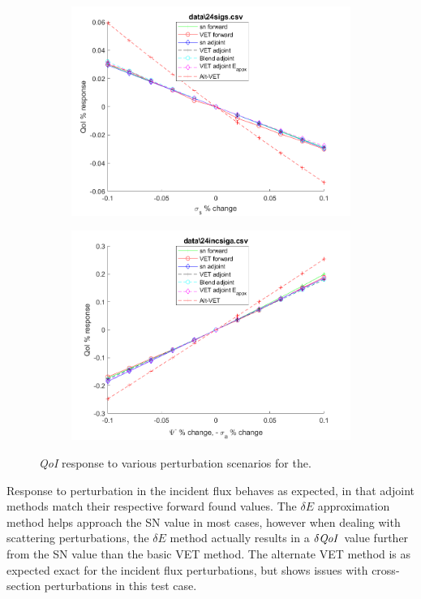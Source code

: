 \documentclass[12pt]{report}
\newcommand{\qoi}{{\it QoI}\xspace}
\begin{document}
\begin{figure}[H]
\begin{subfigure}{.5\textwidth}
  \includegraphics[width=.98\linewidth]{figures2/24sigsSens.png}
  \label{T3:sfig3}
\end{subfigure}%
\begin{subfigure}{.5\textwidth}
  \centering
  \includegraphics[width=.98\linewidth]{figures2/24incsigaSens.png}
  \label{T3:sfig4}
\end{subfigure}
\caption{\qoi response to various perturbation scenarios for the.}
\end{figure}

Response to perturbation in the incident flux behaves as expected, in that adjoint methods match their respective forward found values. The $\delta E$ approximation method helps approach the SN value in most cases, however when dealing with scattering perturbations, the $\delta E$ method actually results in a $\delta \qoi$ value further from the SN value than the basic VET method. The alternate VET method is as expected exact for the incident flux perturbations, but shows issues with cross-section perturbations in this test case.
\end{document}
